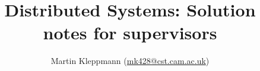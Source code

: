 \documentclass{article}
\begin{document}
\title{Distributed Systems: Solution notes for supervisors}
\author{Martin Kleppmann (\url{mk428@cst.cam.ac.uk})}
\date{}
\maketitle


\end{document}
